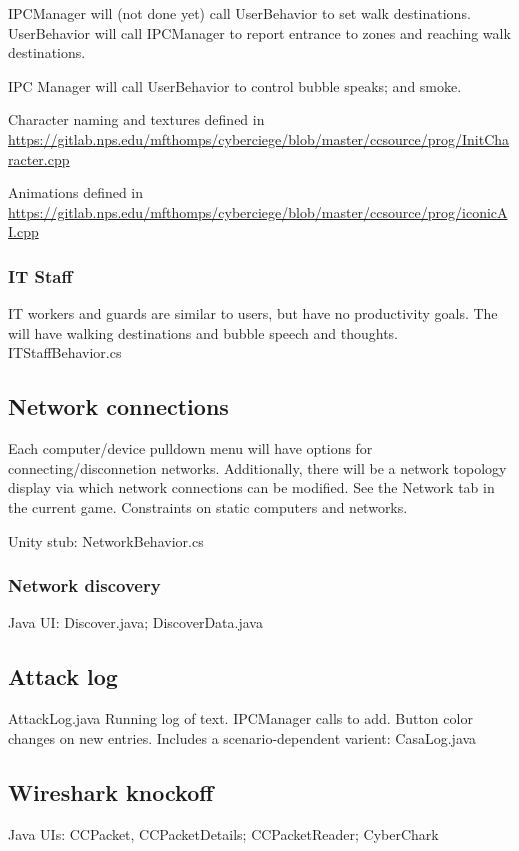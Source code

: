 \documentclass{article}
\begin{document}
IPCManager will (not done yet) call UserBehavior to set walk destinations.
UserBehavior will call IPCManager to report entrance to zones and reaching
walk destinations.

IPC Manager will call UserBehavior to control bubble speaks; and smoke.

Character naming and textures defined in \newline
\url{https://gitlab.nps.edu/mfthomps/cyberciege/blob/master/ccsource/prog/InitCharacter.cpp}

Animations defined in \newline
\url{https://gitlab.nps.edu/mfthomps/cyberciege/blob/master/ccsource/prog/iconicAI.cpp}

\subsubsection{IT Staff}
IT workers and guards are similar to users, but have no productivity goals. The will have walking 
destinations and bubble speech and thoughts.
ITStaffBehavior.cs

\subsection{Network connections}
Each computer/device pulldown menu will have options for connecting/disconnetion networks.
Additionally, there will be a network topology display via which network connections can
be modified.  See the Network tab in the current game.
Constraints on static computers and networks.

Unity stub: NetworkBehavior.cs

\subsubsection{Network discovery}
Java UI:  Discover.java; DiscoverData.java

\subsection{Attack log}
AttackLog.java
Running log of text. IPCManager calls to add.  Button color changes on new entries.
Includes a scenario-dependent varient: CasaLog.java

\subsection{Wireshark knockoff}
Java UIs:
CCPacket, CCPacketDetails; CCPacketReader; CyberChark
\end{document}
